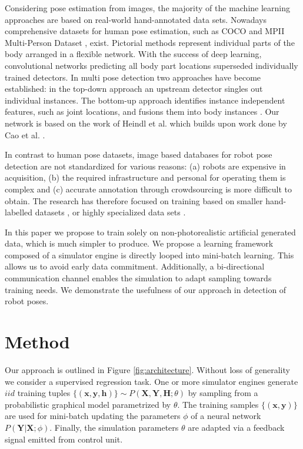 \documentclass[conference]{IEEEtran}
\begin{document}
Considering pose estimation from images, the majority of the machine learning approaches are based on real-world hand-annotated data sets. Nowadays comprehensive datasets for human pose estimation, such as COCO \cite{lin2014microsoft} and MPII Multi-Person Dataset \cite{andriluka20142d}, exist. Pictorial methods \cite{fischler1973representation, felzenszwalb2005pictorial} represent individual parts of the body arranged in a flexible network. With the success of deep learning, convolutional networks \cite{oliveira2016deep} predicting all body part locations superseded individually trained detectors. In multi pose detection two approaches have become established: in the top-down approach \cite{gkioxari2014using, sun2011articulated} an upstream detector singles out individual instances. The bottom-up approach identifies instance independent features, such as joint locations, and fusions them into body instances \cite{insafutdinov2016deepercut, wei2016convolutional}. Our network is based on the work of Heindl et al. \cite{cheind2019disp} which builds upon work done by Cao et al. \cite{cao2017realtime}.

In contrast to human pose datasets, image based databases for robot pose detection are not standardized for various reasons: (a) robots are expensive in acquisition, (b) the required infrastructure and personal for operating them is complex and (c) accurate annotation through crowdsourcing is more difficult to obtain. The research has therefore focused on training based on smaller hand-labelled datasets \cite{miseikis2018multi, miseikis2018transfer, garcia2013guidance, varhegyivisual}, or highly specialized data sets \cite{levine2018learning}.

In this paper we propose to train solely on non-photorealistic artificial generated data, which is much simpler to produce. We propose a learning framework composed of a simulator engine is directly looped into mini-batch learning. This allows us to avoid early data commitment. Additionally, a bi-directional communication channel enables the simulation to adapt sampling towards training needs. We demonstrate the usefulness of our approach in detection of robot poses.


\section{Method}

    Our approach is outlined in Figure \ref{fig:architecture}. Without loss of generality we consider a supervised regression task. One or more simulator engines generate $iid$ training tuples $\{(\textbf{x},\textbf{y},\textbf{h})\} \sim P(\textbf{X},\textbf{Y},\textbf{H};\theta)$ by sampling from a probabilistic graphical model parametrized by $\theta$. The training samples $\{(\textbf{x},\textbf{y})\}$ are used for mini-batch updating the parameters $\phi$ of a neural network $P(\textbf{Y} \lvert \textbf{X};\phi)$. Finally, the simulation parameters $\theta$ are adapted via a feedback signal emitted from control unit.
\end{document}
